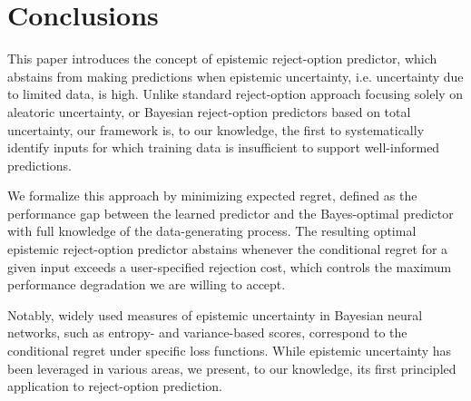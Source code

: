 \section{Conclusions}
This paper introduces the concept of epistemic reject-option predictor, which abstains from making predictions when epistemic uncertainty, i.e. uncertainty due to limited data, is high. Unlike standard reject-option approach focusing solely on aleatoric uncertainty, or Bayesian reject-option predictors based on total uncertainty, our framework is, to our knowledge, the first to systematically identify inputs for which training data is insufficient to support well-informed predictions. 

\vspace{-0.1cm}

We formalize this approach by minimizing expected regret, defined as the performance gap between the learned predictor and the Bayes-optimal predictor with full knowledge of the data-generating process. The resulting optimal epistemic reject-option predictor abstains whenever the conditional regret for a given input exceeds a user-specified rejection cost, which controls the maximum performance degradation we are willing to accept.

\vspace{-0.05cm}

Notably, widely used measures of epistemic uncertainty in Bayesian neural networks, such as entropy- and variance-based scores, correspond to the conditional regret under specific loss functions. While epistemic uncertainty has been leveraged in various areas, we present, to our knowledge, its first principled application to reject-option prediction.



